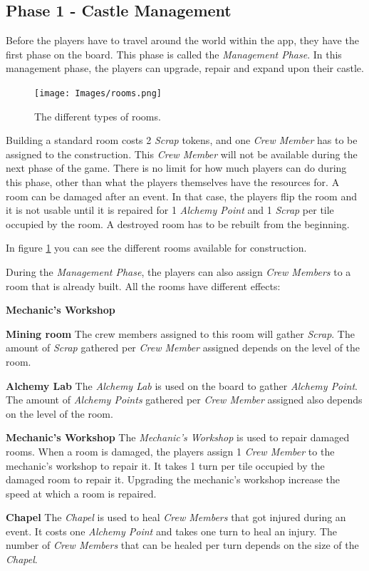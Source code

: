\subsection{Phase 1 - Castle Management}
\label{sec:p1}
Before the players have to travel around the world within the app, they have the first phase on the board. This phase is called the \textit{Management Phase}. In this management phase, the players can upgrade, repair and expand upon their castle.

\begin{figure}[!ht]
    \centering
    \texttt{[image: Images/rooms.png]}
    \caption{The different types of rooms.}
    \label{fig:roomtype}
\end{figure}

Building a standard room costs 2 \textit{Scrap} tokens, and one \textit{Crew Member} has to be assigned to the construction. This \textit{Crew Member} will not be available during the next phase of the game.
There is no limit for how much players can do during this phase, other than what the players themselves have the resources for. A room can be damaged after an event. In that case, the players flip the room and it is not usable until it is repaired for 1 \textit{Alchemy Point} and 1 \textit{Scrap} per tile occupied by the room. A destroyed room has to be rebuilt from the beginning.

In figure \ref{fig:roomtype} you can see the different rooms available for construction.

During the \textit{Management Phase}, the players can also assign \textit{Crew Members} to a room that is already built. All the rooms have different effects:
\begin{labeling}{\textbf{Mechanic's Workshop}}
\item[\textbf{Mining room}] The crew members assigned to this room will gather \textit{Scrap}. The amount of \textit{Scrap} gathered per \textit{Crew Member} assigned depends on the level of the room.
\item[\textbf{Alchemy Lab}] The \textit{Alchemy Lab} is used on the board to gather \textit{Alchemy Point}. The amount of \textit{Alchemy Points} gathered per \textit{Crew Member} assigned also depends on the level of the room.
\item[\textbf{Mechanic's Workshop}] The \textit{Mechanic's Workshop} is used to repair damaged rooms. When a room is damaged, the players assign 1 \textit{Crew Member} to the mechanic's workshop to repair it. It takes 1 turn per tile occupied by the damaged room to repair it. Upgrading the mechanic's workshop increase the speed at which a room is repaired.
\item[\textbf{Chapel}] The \textit{Chapel} is used to heal \textit{Crew Members} that got injured during an event. It costs one \textit{Alchemy Point} and takes one turn to heal an injury. The number of \textit{Crew Members} that can be healed per turn depends on the size of the \textit{Chapel}.
\end{labeling}

